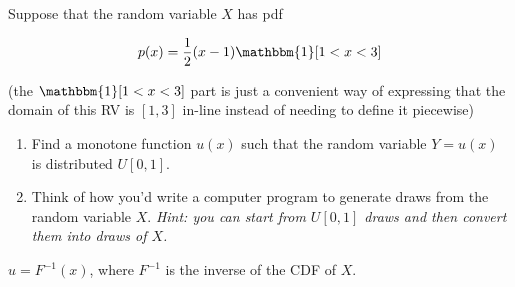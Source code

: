 \documentclass{article}
\begin{document}
Suppose that the random variable $X$ has pdf

\[ p(x) = \frac12 (x - 1) \mathbbm{1}[1 < x < 3] \]

(the $\mathbbm{1}[1 < x < 3]$ part is just a convenient way of expressing that the domain of this RV is $[1, 3]$ in-line instead of needing to define it piecewise)

\begin{enumerate}
\item Find a monotone function $u(x)$ such that the random variable $Y = u(x)$ is distributed $U[0,1]$.
\item Think of how you'd write a computer program to generate draws from the random variable $X$. \textit{Hint: you can start from $U[0, 1]$ draws and then convert them into draws of $X$.} 
\end{enumerate}

\begin{solution}
$u = F^{-1}(x)$, where $F^{-1}$ is the inverse of the CDF of $X$. 
\end{solution}
\end{document}

